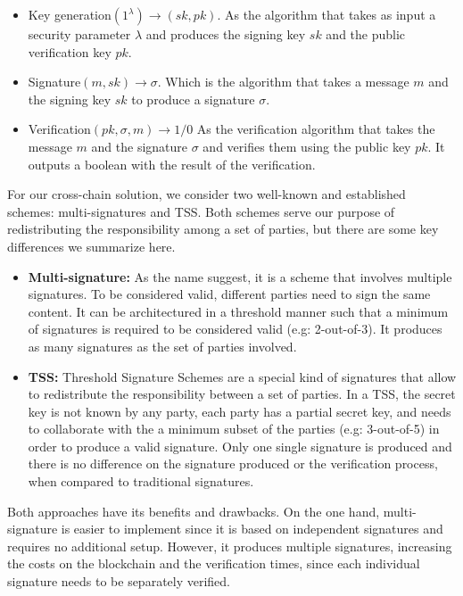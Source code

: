 \begin{itemize}
    \item Key generation$(1^{\lambda}) \rightarrow (sk,pk)$. As the algorithm that takes as input a security parameter $\lambda$ and produces the signing key $sk$ and the public verification key $pk$.
    
    \item Signature$(m, sk) \rightarrow \sigma$. Which is the algorithm that takes a message $m$ and the signing key $sk$ to produce a signature $\sigma$.
    
    \item Verification$(pk,\sigma, m) \rightarrow 1/0$ As the verification algorithm that takes the message $m$ and the signature $\sigma$ and verifies them using the public key $pk$. It outputs a boolean with the result of the verification.
\end{itemize}

For our cross-chain solution, we consider two well-known and established schemes: multi-signatures and TSS. Both schemes serve our purpose of redistributing the responsibility among a set of parties, but there are some key differences we summarize here. 


\begin{itemize}
    \item \textbf{Multi-signature:} As the name suggest, it is a scheme that involves multiple signatures. To be considered valid, different parties need to sign the same content. It can be architectured in a threshold manner such that a minimum of signatures is required to be considered valid (e.g: 2-out-of-3). It produces as many signatures as the set of parties involved.
    
    \item \textbf{TSS:} Threshold Signature Schemes  are a special kind of signatures that allow to redistribute the responsibility between a set of parties. In a TSS, the secret key is not known by any party, each party has a partial secret key, and needs to collaborate with the a minimum subset of the parties (e.g: 3-out-of-5) in order to produce a valid signature. Only one single signature is produced and there is no difference on the signature produced or the verification process, when compared to traditional signatures.
\end{itemize}

Both approaches have its benefits and drawbacks. On the one hand, multi-signature is easier to implement since it is based on independent signatures and requires no additional setup. However, it produces multiple signatures, increasing the costs on the blockchain and the verification times, since each individual signature needs to be separately verified.

